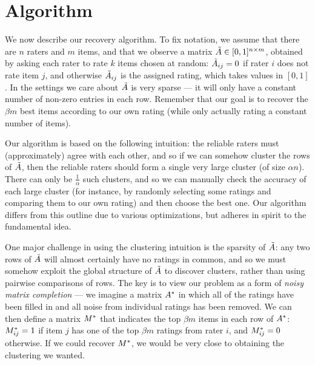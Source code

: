 \section{Algorithm}
\label{sec:algorithm}

We now describe our recovery algorithm. To fix notation, we assume that 
there are $n$ raters and $m$ items, and that we observe a matrix 
$\tilde{A} \in [0,1]^{n \times m}$, obtained by asking each rater to rate $k$ 
items chosen at random: $\tilde{A}_{ij} = 0$ if rater $i$ does not rate item 
$j$, and otherwise $\tilde{A}_{ij}$ is the assigned rating, which takes values 
in $[0,1]$. In the settings we 
care about $\tilde{A}$ is very sparse --- it will only have a constant number of 
non-zero entries in each row. Remember that our goal is to recover the 
$\beta m$ best items according to our own rating (while only actually rating a 
constant number of items).

Our algorithm is based on the following intuition: the reliable raters must 
(approximately) agree with each other, and so if we can somehow cluster the 
rows of $\tilde{A}$, then the reliable raters should form a single very large cluster 
(of size $\alpha n$). There can only be $\frac{1}{\alpha}$ such clusters, and 
so we can manually check the accuracy of each large cluster (for instance, 
by randomly selecting some ratings and comparing them to our own rating) and 
then choose the best one.
Our algorithm differs from this outline due to various 
optimizations, but adheres in spirit to the fundamental idea. 



One major challenge in using the clustering intuition is the sparsity of 
$\tilde{A}$: any two rows of $\tilde{A}$ will almost certainly have no ratings in common, 
and so we must somehow exploit the global structure of $\tilde{A}$ to discover 
clusters, rather than using pairwise comparisons of rows.
The key is to view our problem as a form of \emph{noisy matrix completion} --- 
we imagine a matrix $A^*$ in which all of the ratings have been filled in 
and all noise from individual ratings has been removed. We can then define a 
matrix $M^*$ that indicates the top $\beta m$ items in each row of $A^*$: 
$M^*_{ij} = 1$ if item $j$ has one of the top $\beta m$ ratings from rater $i$, 
and $M^*_{ij} = 0$ otherwise. If we could recover $M^*$, we would be very 
close to obtaining the clustering we wanted.

